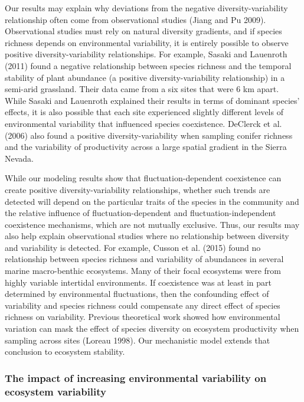 \documentclass[12pt,]{article}
\begin{document}
Our results may explain why deviations from the negative
diversity-variability relationship often come from observational studies
(Jiang and Pu 2009). Observational studies must rely on natural
diversity gradients, and if species richness depends on environmental
variability, it is entirely possible to observe positive
diversity-variability relationships. For example, Sasaki and Lauenroth
(2011) found a negative relationship between species richness and the
temporal stability of plant abundance (a positive diversity-variability
relationship) in a semi-arid grassland. Their data came from a six sites
that were 6 km apart. While Sasaki and Lauenroth explained their results
in terms of dominant species' effects, it is also possible that each
site experienced slightly different levels of environmental variability
that influenced species coexistence. DeClerck et al. (2006) also found a
positive diversity-variability when sampling conifer richness and the
variability of productivity across a large spatial gradient in the
Sierra Nevada.

While our modeling results show that fluctuation-dependent coexistence
can create positive diversity-variability relationships, whether such
trends are detected will depend on the particular traits of the species
in the community and the relative influence of fluctuation-dependent and
fluctuation-independent coexistence mechanisms, which are not mutually
exclusive. Thus, our results may also help explain observational studies
where no relationship between diversity and variability is detected. For
example, Cusson et al. (2015) found no relationship between species
richness and variability of abundances in several marine macro-benthic
ecosystems. Many of their focal ecosystems were from highly variable
intertidal environments. If coexistence was at least in part determined
by environmental fluctuations, then the confounding effect of
variability and species richness could compensate any direct effect of
species richness on variability. Previous theoretical work showed how
environmental variation can mask the effect of species diversity on
ecosystem productivity when sampling across sites (Loreau 1998). Our
mechanistic model extends that conclusion to ecosystem stability.

\subsubsection{The impact of increasing environmental variability on
ecosystem
variability}\label{the-impact-of-increasing-environmental-variability-on-ecosystem-variability}
\end{document}
